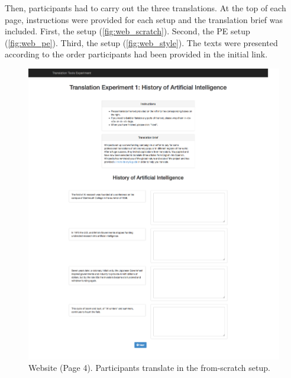 Then, participants had to carry out the three translations. At the top of each page, instructions were provided for each setup and the translation brief was included. First, the \scratch setup (\autoref{fig:web_scratch}). Second, the \ac{PE} setup (\autoref{fig:web_pe}). Third, the \style setup (\autoref{fig:web_style}). The texts were presented according to the order participants had been provided in the initial link.

\begin{figure}[h]
\myfloatalign
\includegraphics[width=\textwidth]{img/web/web_4.png}
\caption{Website (Page 4). Participants translate in the from-scratch setup.}
\label{fig:web_scratch}
\end{figure}

